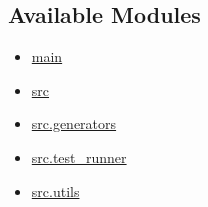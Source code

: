 \hypertarget{available-modules}{%
\subsection{Available Modules}\label{available-modules}}

\begin{itemize}
\tightlist
\item
  \href{main.html}{main}
\item
  \href{src.html}{src}
\item
  \href{src/generators.html}{src.generators}
\item
  \href{src/test_runner.html}{src.test\_runner}
\item
  \href{src/utils.html}{src.utils}
\end{itemize}

\href{https://pdoc.dev}{}
